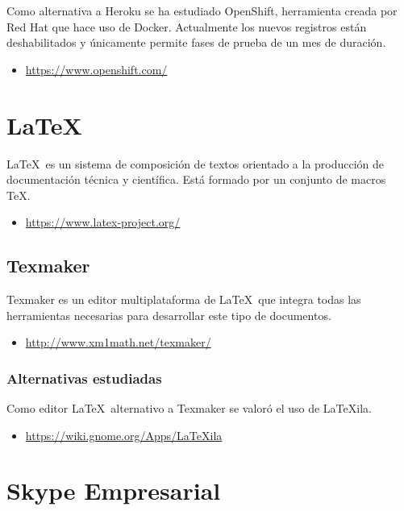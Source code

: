 Como alternativa a Heroku se ha estudiado OpenShift, herramienta creada por Red Hat que hace uso de Docker. Actualmente los nuevos registros están deshabilitados y únicamente permite fases de prueba de un mes de duración.

\begin{itemize}
	\item \url{https://www.openshift.com/}
\end{itemize}


\section{LaTeX}

\LaTeX\ es un sistema de composición de textos orientado a la producción de documentación técnica y científica. Está formado por un conjunto de macros \TeX.

\begin{itemize}
	\item \url{https://www.latex-project.org/}
\end{itemize}

\subsection{Texmaker}

Texmaker es un editor multiplataforma de \LaTeX\ que integra todas las herramientas necesarias para desarrollar este tipo de documentos.

\begin{itemize}
	\item \url{http://www.xm1math.net/texmaker/}
\end{itemize}

\subsubsection{Alternativas estudiadas}

Como editor \LaTeX\ alternativo a Texmaker se valoró el uso de LaTeXila.

\begin{itemize}
	\item \url{https://wiki.gnome.org/Apps/LaTeXila}
\end{itemize}

\section{Skype Empresarial}

